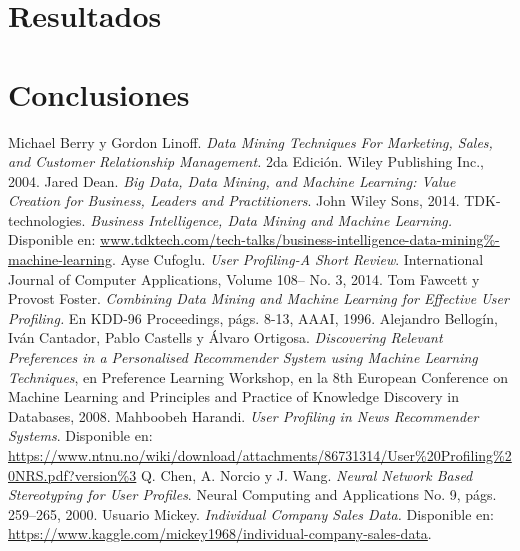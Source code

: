 \documentclass[letterpaper,11pt]{article}
\begin{document}
\begin{multicols}{2}
\section{Resultados}
\section{Conclusiones}

\begin{thebibliography}{10}
     Michael Berry y Gordon Linoff. {\em Data Mining Techniques For Marketing, Sales, and Customer Relationship Management.} 
        2da Edición. Wiley Publishing Inc., 2004. 
     Jared Dean. {\em Big Data, Data Mining, and Machine Learning: Value Creation for Business, Leaders and
        Practitioners}. John Wiley  Sons, 2014.
     TDK-technologies. {\em Business Intelligence, Data Mining and Machine Learning.} 
        Disponible en: \url{www.tdktech.com/tech-talks/business-intelligence-data-mining%-machine-learning}. 
     Ayse Cufoglu. {\em User Profiling-A Short Review}. International Journal of Computer Applications,
        Volume 108-- No. 3, 2014.
     Tom Fawcett y Provost Foster. {\em Combining Data Mining and Machine Learning for Effective User
        Profiling.} En KDD-96 Proceedings, págs. 8-13, AAAI, 1996.
     Alejandro Bellogín, Iván Cantador, Pablo Castells y Álvaro Ortigosa. {\em Discovering Relevant Preferences in a Personalised
        Recommender System using Machine Learning Techniques}, en Preference Learning Workshop, en la 8th
        European Conference on Machine  Learning and Principles and Practice of Knowledge Discovery in Databases, 2008. 
     Mahboobeh Harandi. {\em User Profiling in News Recommender Systems}. Disponible en:
        \url{https://www.ntnu.no/wiki/download/attachments/86731314/User%20Profiling%20NRS.pdf?version%3}
         Q. Chen, A. Norcio y J. Wang. {\em Neural Network Based Stereotyping for User Profiles}. Neural
            Computing and Applications No. 9, págs. 259--265,  2000.
         Usuario Mickey. {\em Individual Company Sales Data.} Disponible en:
            \url{https://www.kaggle.com/mickey1968/individual-company-sales-data}. 

\end{thebibliography}
\end{multicols}
\end{document}
